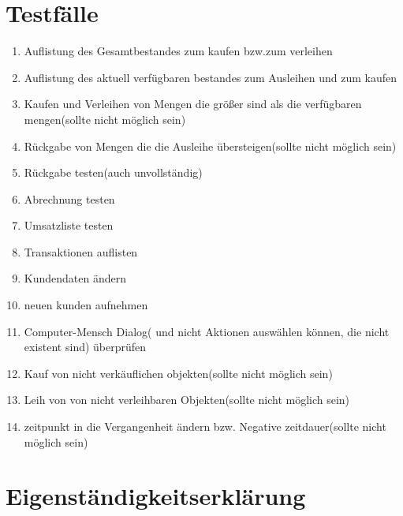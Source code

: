 \documentclass[a4paper,12pt]{report}
\begin{document}
\part{Testfälle}
\begin{enumerate}
\item
Auflistung des Gesamtbestandes zum kaufen bzw.zum verleihen 
\item
Auflistung des aktuell verfügbaren bestandes zum Ausleihen und zum kaufen
\item
Kaufen und Verleihen von Mengen die größer sind als die verfügbaren mengen(sollte nicht möglich sein)
\item
Rückgabe von Mengen die die Ausleihe übersteigen(sollte nicht möglich sein)
\item
Rückgabe testen(auch unvollständig)
\item
Abrechnung testen
\item
Umsatzliste testen
\item
Transaktionen auflisten
\item
Kundendaten ändern 
\item
neuen kunden aufnehmen
\item
Computer-Mensch Dialog( und nicht Aktionen auswählen können, die nicht existent sind) überprüfen
\item
Kauf von nicht verkäuflichen objekten(sollte nicht möglich sein)
\item
Leih von von nicht verleihbaren Objekten(sollte nicht möglich sein)
\item
zeitpunkt in die Vergangenheit ändern bzw. Negative zeitdauer(sollte nicht möglich sein)

\end{enumerate}
\appendix
\part{Eigenständigkeitserklärung}
\end{document}
